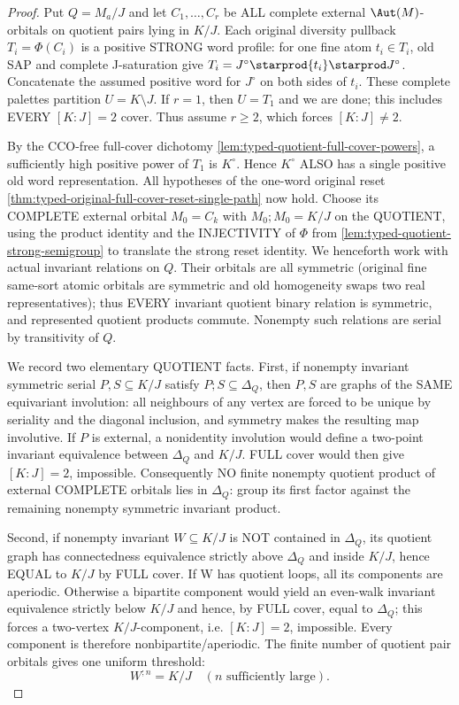 \begin{proof}
Put $Q=M_a/J$ and let $C_1,\ldots,C_r$
be ALL complete external $\Aut(M)$-orbitals
on quotient pairs lying in $K/J$.
Each original diversity pullback
$T_i=\Phi(C_i)$ is a positive STRONG word
profile: for one fine atom $t_i\in T_i$,
old SAP and complete J-saturation give
$T_i=J^\circ\starprod\{t_i\}
                        \starprod J^\circ$.
Concatenate the assumed positive word
for $J^\circ$ on both sides of $t_i$.
These complete palettes partition
$U=K\setminus J$. If $r=1$, then
$U=T_1$ and we are done; this includes
EVERY $[K:J]=2$ cover. Thus assume $r\ge2$,
which forces $[K:J]\ne2$.

By the CCO-free full-cover dichotomy
\cref{lem:typed-quotient-full-cover-powers},
a sufficiently high positive power of
$T_1$ is $K^\circ$. Hence $K^\circ$
ALSO has a single positive old word
representation. All hypotheses of
the one-word original reset
\cref{thm:typed-original-full-cover-reset-single-path}
now hold. Choose its COMPLETE external
orbital $M_0=C_k$ with
$M_0;M_0=K/J$ on the QUOTIENT, using
the product identity and the INJECTIVITY of $\Phi$
from \cref{lem:typed-quotient-strong-semigroup}
to translate the strong reset identity.
We henceforth work with actual invariant
relations on $Q$. Their orbitals are all
symmetric (original fine same-sort
atomic orbitals are symmetric and old
homogeneity swaps two real representatives);
thus EVERY invariant quotient binary relation
is symmetric, and represented quotient
products commute. Nonempty such relations
are serial by transitivity of $Q$.

We record two elementary QUOTIENT facts.
First, if nonempty invariant symmetric
serial $P,S\subseteq K/J$ satisfy
$P;S\subseteq\Delta_Q$, then $P,S$
are graphs of the SAME equivariant
involution: all neighbours of any
vertex are forced to be unique by
seriality and the diagonal inclusion,
and symmetry makes the resulting
map involutive. If $P$ is external,
a nonidentity involution would define
a two-point invariant equivalence
between $\Delta_Q$ and $K/J$.
FULL cover would then give
$[K:J]=2$, impossible. Consequently
NO finite nonempty quotient product
of external COMPLETE orbitals lies
in $\Delta_Q$: group its first factor
against the remaining nonempty
symmetric invariant product.

Second, if nonempty invariant
$W\subseteq K/J$ is NOT contained
in $\Delta_Q$, its quotient graph has
connectedness equivalence strictly
above $\Delta_Q$ and inside $K/J$,
hence EQUAL to $K/J$ by FULL cover.
If W has quotient loops, all its
components are aperiodic. Otherwise
a bipartite component would yield an
even-walk invariant equivalence strictly
below $K/J$ and hence, by FULL cover,
equal to $\Delta_Q$; this forces a
two-vertex $K/J$-component, i.e.
$[K:J]=2$, impossible. Every component
is therefore nonbipartite/aperiodic.
The finite number of quotient pair
orbitals gives one uniform threshold:
\[
                       W^{;n}=K/J
                    \quad(n\text{ sufficiently large}).
\tag{OWL-P}\label{eq:typed-old-cover-quotient-powers}
\]


\end{proof}
